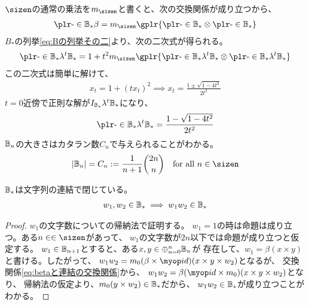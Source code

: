 {	$\sizen$の通常の乗法を$m_\sizen$と書くと、次の交換関係が成り立つから、
	\begin{equation*}\begin{split}
		\isA{\setB_*}\beta = m_\sizen\gplr{\isA{\setB_*}\otimes\isA{\setB_*}}
	\end{split}\end{equation*}
	$B_*$の列挙\eqref{eq:Bの列挙その二}より、次の二次式が得られる。
	\begin{equation*}\begin{split}
		\isA{\setB_*}{\ls^t\setB_*} = 1 + t^2m_\sizen\gplr{
			\isA{\setB_*}\ls^t\setB_*\otimes \isA{\setB_*}\ls^t\setB_*}
	\end{split}\end{equation*}
	この二次式は簡単に解けて、
	\begin{equation*}\begin{split}
		x_t = 1 + (tx_t)^2 \implies x_t = \frac{1 \pm \sqrt{1 - 4t^2}}{2t^2}
	\end{split}\end{equation*}
	$t=0$近傍で正則な解が$I_{\mathbb{B}_*}{\lambda}^t\mathbb{B}_*$になり、
	\begin{equation*}\begin{split}
		\isA{\setB_*}\ls^t\setB_* = \frac{1 - \sqrt{1 - 4t^2}}{2t^2}
	\end{split}\end{equation*}
	$\mathbb{B}_n$の大きさはカタラン数$C_n$で与えられることがわかる。
	\begin{equation*}\begin{split}
		|\setB_n| = C_n := \frac{1}{n+1}\binom{2n}{n}
		\quad\text{for all } n\in\sizen
	\end{split}\end{equation*}

	$\mathbb{B}_*$は文字列の連結で閉じている。
	\begin{equation*}\begin{split}
		w_1,w_2\in\mathbb{B}_*\implies w_1w_2\in\mathbb{B}_*
	\end{split}\end{equation*}
	\begin{proof} %
		$w_1$の文字数についての帰納法で証明する。
		$w_1=1$の時は命題は成り立つ。ある$n\in\in\sizen$があって、
		$w_1$の文字数が$2n$以下では命題が成り立つと仮定する。
		$w_1\in\mathbb{B}_{n+1}$とすると、ある$x,y\in\oplus_{n=0}^n\mathbb{B}_n$が
		存在して、$w_1=\beta(x\times y)$と書ける。したがって、
		$w_1w_2=m_0(\beta\times\id)(x\times y\times w_2)$となるが、
		交換関係\eqref{eq:betaと連結の交換関係}から、
		$w_1w_2=\beta(\id\times m_0)(x\times y\times w_2)$となり、
		帰納法の仮定より、$m_0(y\times w_2)\in\mathbb{B}_*$だから、
		$w_1w_2\in\mathbb{B}_*$が成り立つことがわかる。
	\end{proof} %

}
